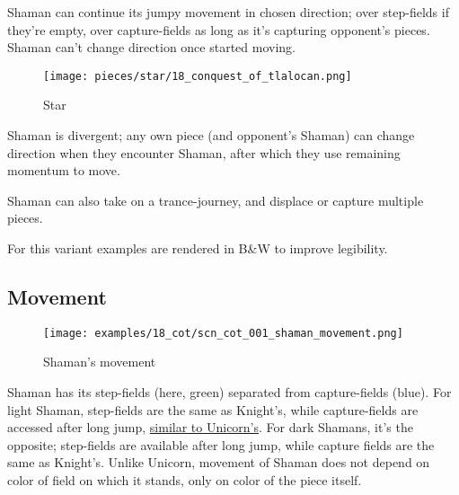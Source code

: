 Shaman can continue its jumpy movement in chosen direction; over step-fields
if they're empty, over capture-fields as long as it's capturing opponent's
pieces. Shaman can't change direction once started moving.

\noindent
\begin{wrapfigure}[10]{l}{0.4\textwidth}
\centering
\texttt{[image: pieces/star/18\_conquest\_of\_tlalocan.png]}
\vspace*{-1.4\baselineskip}
\caption{Star}
\label{fig:star/18_conquest_of_tlalocan}
\end{wrapfigure}
Shaman is divergent; any own piece (and opponent's Shaman) can change direction
when they encounter Shaman, after which they use remaining momentum to move.

Shaman can also take on a trance-journey, and displace or capture multiple
pieces.

\noindent
For this variant examples are rendered in B\&W to improve legibility.

\clearpage %

\subsection*{Movement}
\label{sec:Conquest of Tlalocan/Shaman/Movement}

\vspace*{-1.4\baselineskip}
\noindent
\begin{figure}[!h]
\texttt{[image: examples/18\_cot/scn\_cot\_001\_shaman\_movement.png]}
\vspace*{-1.4\baselineskip}
\caption{Shaman's movement}
\label{fig:scn_cot_001_shaman_movement}
\end{figure}

\vspace*{-0.4\baselineskip}
Shaman has its step-fields (here, green) separated from capture-fields (blue). For
light Shaman, step-fields are the same as Knight's, while capture-fields are accessed
after long jump, \hyperref[fig:scn_aoa_02_unicorn_opposite_color]{similar to Unicorn's}.
For dark Shamans, it's the opposite; step-fields are available after long jump, while
capture fields are the same as Knight's. Unlike Unicorn, movement of Shaman does not
depend on color of field on which it stands, only on color of the piece itself.

